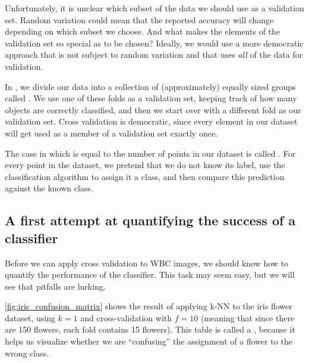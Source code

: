 \begin{qbox}\end{qbox}

Unfortunately, it is unclear which subset of the data we should use as a validation set. Random variation could mean that the reported accuracy will change depending on which subset we choose. And what makes the elements of the validation set so special as to be chosen? Ideally, we would use a more democratic approach that is not subject to random variation and that uses \textit{all} of the data for validation.

In , we divide our data into a collection of  (approximately) equally sized groups called . We use one of these folds as a validation set, keeping track of how many objects are correctly classified, and then we start over with a different fold as our validation set. Cross validation is democratic, since every element in our dataset will get used as a member of a validation set exactly once.

The case in which  is equal to the number of points in our dataset is called . For every point in the dataset, we pretend that we do not know its label, use the classification algorithm to assign it a class, and then compare this prediction against the known class.

\FloatBarrier
{}
\subsection{A first attempt at quantifying the success of a classifier}

Before we can apply cross validation to WBC images, we should know how to quantify the performance of the classifier. This task may seem easy, but we will see that pitfalls are lurking.

\autoref{fig:iris_confusion_matrix} shows the result of applying k-NN to the iris flower dataset, using $k = 1$ and cross-validation with $f = 10$ (meaning that since there are 150 flowers, each fold contains 15 flowers). This table is called a , because it helps us visualize whether we are ``confusing'' the assignment of a flower to the wrong class.\\

